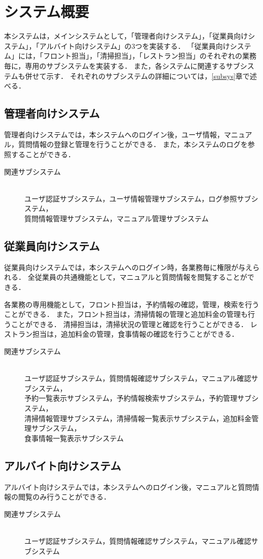 

\section{システム概要}\label{sec:sys}
本システムは，メインシステムとして，「管理者向けシステム」，「従業員向けシステム」，「アルバイト向けシステム」の3つを実装する．
「従業員向けシステム」には，「フロント担当」，「清掃担当」，「レストラン担当」のそれぞれの業務毎に，専用のサブシステムを実装する．
また，各システムに関連するサブシステムも併せて示す．
それぞれのサブシステムの詳細については，\ref{subsys}章で述べる．

\subsection{管理者向けシステム}
管理者向けシステムでは，本システムへのログイン後，ユーザ情報，マニュアル，質問情報の登録と管理を行うことができる．
また，本システムのログを参照することができる．
\begin{description}
\item[関連サブシステム]　\\
ユーザ認証サブシステム，ユーザ情報管理サブシステム，ログ参照サブシステム，\\
質問情報管理サブシステム，マニュアル管理サブシステム
\end{description}

\subsection{従業員向けシステム}
従業員向けシステムでは，本システムへのログイン時，各業務毎に権限が与えられる．
全従業員の共通機能として，マニュアルと質問情報を閲覧することができる．

各業務の専用機能として，フロント担当は，予約情報の確認，管理，検索を行うことができる．
また，フロント担当は，清掃情報の管理と追加料金の管理も行うことができる．
清掃担当は，清掃状況の管理と確認を行うことができる．
レストラン担当は，追加料金の管理，食事情報の確認を行うことができる．
\begin{description}
\item[関連サブシステム]　\\
ユーザ認証サブシステム，質問情報確認サブシステム，マニュアル確認サブシステム，\\
予約一覧表示サブシステム，予約情報検索サブシステム，予約管理サブシステム，\\
清掃情報管理サブシステム，清掃情報一覧表示サブシステム，追加料金管理サブシステム，\\
食事情報一覧表示サブシステム
\end{description}

\subsection{アルバイト向けシステム}
アルバイト向けシステムでは，本システムへのログイン後，マニュアルと質問情報の閲覧のみ行うことができる．
\begin{description}
\item[関連サブシステム]　\\
ユーザ認証サブシステム，質問情報確認サブシステム，マニュアル確認サブシステム
\end{description}


